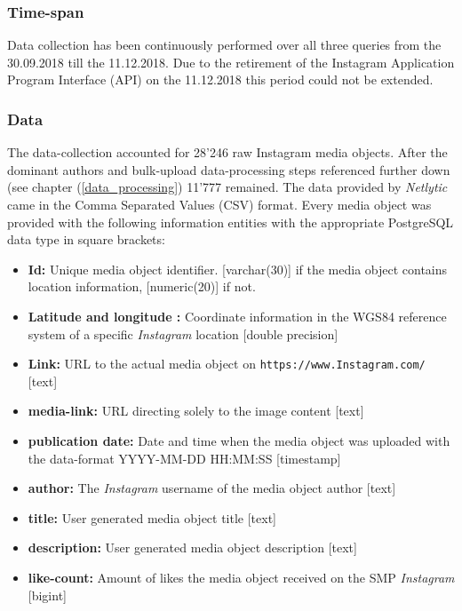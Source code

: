 \subsubsection{Time-span} \label{Instagram_timespan}
Data collection has been continuously performed over all three queries from the 30.09.2018 till the 11.12.2018. Due to the retirement of the Instagram Application Program Interface (API) on the 11.12.2018 \parencite{Instagram2018} this period could not be extended.

\subsubsection{Data} \label{Instagram_data}
The data-collection accounted for 28'246 raw Instagram media objects. After the dominant authors and bulk-upload data-processing steps referenced further down (see chapter (\ref{data_processing}) 11'777 remained.
The data provided by \textit{Netlytic} came in the Comma Separated Values (CSV) format. Every media object was provided with the following information entities with the appropriate PostgreSQL data type in square brackets:
\begin{itemize}[label={}]
    \item \textbf{Id:} Unique media object identifier. [varchar(30)] if the media object contains location information, [numeric(20)] if not.
    \item \textbf{Latitude and longitude
    :} Coordinate information in the WGS84 reference system of a specific \textit{Instagram} location [double precision]
    \item \textbf{Link:} URL to the actual media object on \texttt{https://www.Instagram.com/} [text]
    \item \textbf{media-link:} URL directing solely to the image content [text]
    \item \textbf{publication date:} Date and time when the media object was uploaded with the data-format YYYY-MM-DD HH:MM:SS [timestamp]
    \item \textbf{author:} The \textit{Instagram} username of the media object author [text]
    \item \textbf{title:} User generated media object title [text]
    \item \textbf{description:} User generated media object description [text] 
    \item \textbf{like-count:} Amount of likes the media object received on the SMP \textit{Instagram} [bigint]
\end{itemize}

